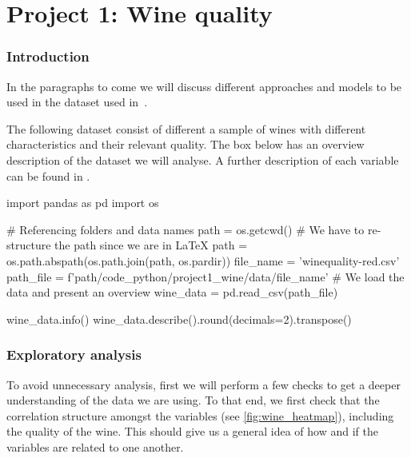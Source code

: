 \documentclass[11pt]{article}
\begin{document}
\part[wine]{Project 1: Wine quality} \label{part:wine}

\section*{Introduction}
In the paragraphs to come we will discuss different approaches and models to be used in the dataset used in~\cite{wine}.

The following dataset consist of different a sample of wines with different characteristics and their relevant
quality.
The box below has an overview description of the dataset we will analyse.
A further description of each variable can be found in .

\begin{pyconcode}
import pandas as pd
import os

# Referencing folders and data names
path = os.getcwd()
# We have to re-structure the path since we are in LaTeX
path = os.path.abspath(os.path.join(path, os.pardir))
file_name = 'winequality-red.csv'
path_file = f'{path}/code_python/project1_wine/data/{file_name}'
# We load the data and present an overview
wine_data = pd.read_csv(path_file)
\end{pyconcode}

\begin{pyconsole}[][frame=single]
wine_data.info()
wine_data.describe().round(decimals=2).transpose()
\end{pyconsole}

\section*{Exploratory analysis}

To avoid unnecessary analysis, first we will perform a few checks to get a deeper understanding of the
data we are using.
To that end, we first check that the correlation structure amongst the variables (see \cref{fig:wine_heatmap}),
including the quality of the wine.
This should give us a general idea of how and if the variables are related to one another.
\end{document}
